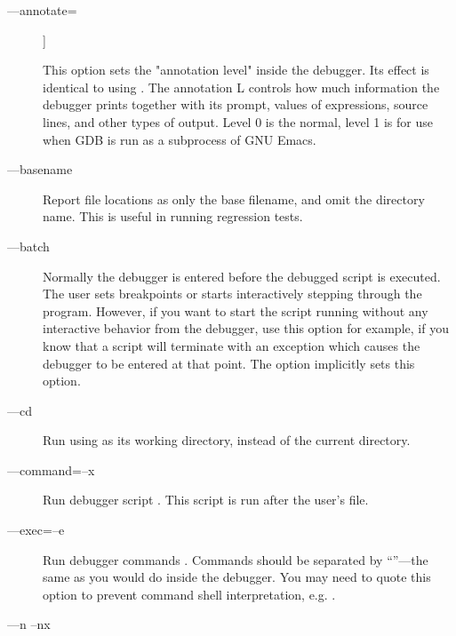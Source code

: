 \begin{description} 

\item[--{}--annotate=]]

This option sets the "annotation level" inside the debugger.  Its
effect is identical to using . The
annotation L controls how much information the debugger
prints together with its prompt, values of expressions, source lines,
and other types of output.  Level 0 is the normal, level 1 is for use
when GDB is run as a subprocess of GNU Emacs.

\item[--{}--basename]

Report file locations as only the base filename, and omit the
directory name. This is useful in running regression tests.

\item[--{}--batch]

Normally the debugger is entered before the debugged script is
executed. The user sets breakpoints or starts interactively stepping
through the program. However, if you want to start the script running
without any interactive behavior from the debugger, use this option
for example, if you know that a script will terminate with an
exception which causes the debugger to be entered at that point. The
 option implicitly sets this option.

\item[--{}--cd ]

Run  using  as its working directory,
instead of the current directory.

\item[--{}--command=\code{\Large{|}}--x ]\label{switch:command}

Run debugger script . This script is run after
the user's  file.

\item[--{}--exec=\code{\Large{|}}--e ]\label{exec:command}

Run debugger commands . Commands should be separated
by ``\code{;;}''---the same as you would do inside the debugger. You may
need to quote this option to prevent command shell
interpretation, e.g. .

\item[--{}--n\code{\Large{|}} --nx]\label{switch:nx}


\end{description}

